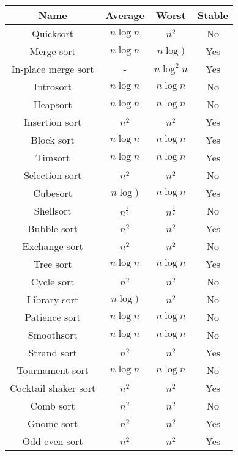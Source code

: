\documentclass{article}
\begin{document}
\begin{table}[ht]
	\centering
	\begin{tabular}{cccc}
		Name & Average & Worst & Stable\\
		\hline
		Quicksort & $n\log{n}$ & $n^2$ & No\\
		Merge sort & $n\log{n}$ & $n\log{)}$ & Yes\\
		In-place merge sort & - & $n\log^2{n}$ & Yes\\
		Introsort & $n\log{n}$ & $n\log{n}$ & No\\
		Heapsort & $n\log{n}$ & $n\log{n}$ & No\\
		Insertion sort & $n^2$ & $n^2$ & Yes\\
		Block sort & $n\log{n}$ & $n\log{n}$ & Yes\\
		Timsort & $n\log{n}$ & $n\log{n}$ & Yes\\
		Selection sort & $n^2$ & $n^2$ & No\\
		Cubesort & $n\log{)}$ & $n\log{n}$ & Yes\\
		Shellsort & $n^{\frac{4}{3}}$ & $n^{\frac{3}{2}}$ & No\\
		Bubble sort & $n^2$ & $n^2$ & Yes\\
		Exchange sort & $n^2$ & $n^2$ & No\\
		Tree sort & $n\log{n}$ & $n\log{n}$ & Yes\\
		Cycle sort & $n^2$ & $n^2$ & No\\
		Library sort & $n\log{)}$ & $n^2$ & No\\
		Patience sort & $n\log{n}$ & $n\log{n}$ & No\\
		Smoothsort & $n\log{n}$ & $n\log{n}$ & No\\
		Strand sort & $n^2$ & $n^2$ & Yes\\
		Tournament sort & $n\log{n}$ & $n\log{n}$ & No\\
		Cocktail shaker sort & $n^2$ & $n^2$ & Yes\\
		Comb sort & $n^2$ & $n^2$ & No\\
		Gnome sort & $n^2$ & $n^2$ & Yes\\
		Odd-even sort & $n^2$ & $n^2$ & Yes\\
		\hline
	\end{tabular}
\end{table}

\end{document}
